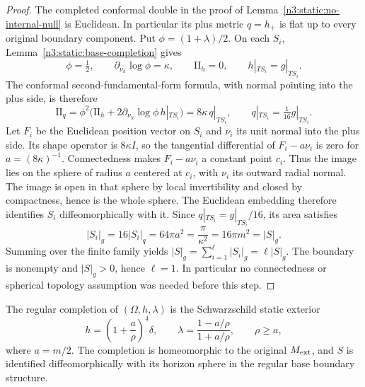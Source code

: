 \begin{proof}
The completed conformal double in the proof of
Lemma~\ref{n3:static:no-internal-null} is Euclidean. In particular its
plus metric $q=h_+$ is flat up to every original boundary component.
Put $\phi=(1+\lambda)/2$. On each $S_i$,
Lemma~\ref{n3:static:base-completion} gives
\[
\phi=\tfrac12,\qquad
\partial_{\nu_h}\log\phi=\kappa,\qquad
\mathrm{II}_h=0,\qquad h|_{TS_i}=g|_{TS_i}.
\]
The conformal second-fundamental-form formula, with normal pointing
into the plus side, is therefore
\[
\mathrm{II}_q
 =\phi^2\bigl(\mathrm{II}_h+
 2\partial_{\nu_h}\log\phi\,h|_{TS_i}\bigr)
 =8\kappa\,q|_{TS_i},
 \qquad q|_{TS_i}=\tfrac1{16}g|_{TS_i}.
\]
Let $F_i$ be the Euclidean position vector on $S_i$ and $\nu_i$
its unit normal into the plus side. Its shape operator is
$8\kappa I$, so the tangential differential of $F_i-a\nu_i$ is
zero for $a=(8\kappa)^{-1}$. Connectedness makes $F_i-a\nu_i$
a constant point $c_i$. Thus the image lies on the sphere of radius
$a$ centered at $c_i$, with $\nu_i$ its outward radial normal.
The image is open in that sphere by local invertibility and closed
by compactness, hence is the whole sphere. The Euclidean embedding
therefore identifies $S_i$ diffeomorphically with it.
Since $q|_{TS_i}=g|_{TS_i}/16$, its area satisfies
\begin{equation}
\label{n3:static:individual-boundary-area}
|S_i|_g=16|S_i|_q=64\pi a^2
 =\frac{\pi}{\kappa^2}=16\pi m^2=|S|_g.
\end{equation}
Summing over the finite family yields
$|S|_g=\sum_{i=1}^{\ell}|S_i|_g=\ell|S|_g$. The boundary is nonempty
and $|S|_g>0$, hence $\ell=1$. In particular no connectedness or spherical
topology assumption was needed before this step.
\end{proof}

\begin{lemma}
\label{n3:static:schwarzschild-base}
The regular completion of \((\Omega,h,\lambda)\) is the
Schwarzschild static exterior
\begin{equation}
\label{n3:static:isotropic-base}
h=\left(1+\frac a\rho\right)^4\delta,\qquad
\lambda=\frac{1-a/\rho}{1+a/\rho},\qquad
\rho\geq a,
\end{equation}
where \(a=m/2\).
The completion is homeomorphic to the original \(M_{\mathrm{ext}}\),
and \(S\) is identified diffeomorphically with its horizon sphere
in the regular base boundary structure.
\end{lemma}

